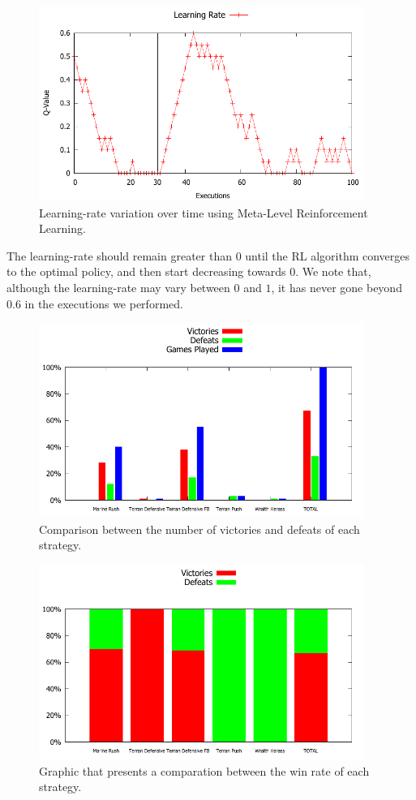 \begin{figure}[ht]
\centering
\includegraphics[width=400px]{images/learning-rate_graphic}
\caption{Learning-rate variation over time using Meta-Level Reinforcement Learning.}
\label{fig:learning-rate_graphic}
\end{figure}

The learning-rate should remain greater than $0$ until the RL algorithm converges to the optimal policy, and then start decreasing towards $0$.
We note that, although the learning-rate may vary between $0$ and $1$, it has never gone beyond $0.6$ in the executions we performed.

\begin{figure}[ht]
\centering
\includegraphics[width=400px]{images/wins_graphic}
\caption{Comparison between the number of victories and defeats of each strategy.}
\label{fig:wins_graphic}
\end{figure}

\begin{figure}[ht]
\centering
\includegraphics[width=400px]{images/win-rates_graphic}
\caption{Graphic that presents a comparation between the win rate of each strategy.}
\label{fig:win-rates_graphic}
\end{figure}

